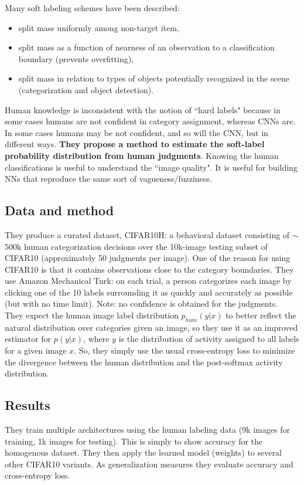 Many soft labeling schemes have been described:
\begin{itemize}
    \item split mass uniformly among non-target item,
    \item split mass as a function of nearness of an observation to a classification boundary (prevents overfitting),
    \item split mass in relation to types of objects potentially recognized in the scene (categorization and object detection).
\end{itemize}

Human knowledge is inconsistent with the notion of ``hard labels" because in some cases humans are not confident in category assignment, whereas CNNs are. In some cases humans may be not confident, and so will the CNN, but in different ways. \textbf{They propose a method to estimate the soft-label probability distribution from human judgments}. Knowing the human classifications is useful to understand the ``image quality". It is useful for building NNs that reproduce the same sort of vagueness/fuzziness.

\subsection{Data and method}
They produce a curated dataset, CIFAR10H: a behavioral dataset consisting of $\sim$500k human categorization decisions over the 10k-image testing subset of CIFAR10 (approximately 50 judgments per image). One of the reason for using  CIFAR10 is that it contains observations close to the category boundaries. They use Amazon Mechanical Turk: on each trial, a person categorizes each image by clicking one of the 10 labels surrounding it as quickly and accurately as possible (but with no time limit). Note: no confidence is obtained for the judgments.\\  

They expect the human image label distribution $p_{hum}(y|x)$ to better reflect the natural distribution over categories given an image, so they use it as an improved estimator for $p(y|x)$, where $y$ is the distribution of activity assigned to all labels for a given image $x$. So, they simply use the usual cross-entropy loss to minimize the divergence between the human distribution and the post-softmax activity distribution.

\subsection{Results}
They train multiple architectures using the human labeling data (9k images for training, 1k images for testing). This is simply to show accuracy for the homogenous dataset.
They then apply the learned model (weights) to several other CIFAR10 variants. As generalization measures they evaluate accuracy and cross-entropy loss.\\

